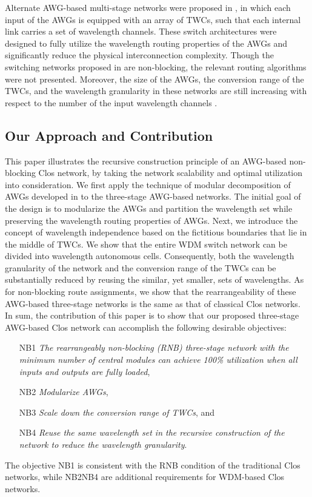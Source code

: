 \documentclass[journal]{IEEEtran}
\begin{document}
Alternate AWG-based multi-stage networks were proposed in
\cite{Bregni:JSAC2003,Maier:CM2004,Zhong:JLT1996,Leonardus:EU2007},
in which each input of the AWGs is equipped with an array of TWCs,
such that each internal link carries a set of wavelength channels.
These switch architectures were designed to fully utilize the
wavelength routing properties of the AWGs and significantly reduce
the physical interconnection complexity. Though the switching
networks proposed in \cite{Zhong:JLT1996,Leonardus:EU2007} are
non-blocking, the relevant routing algorithms were not presented.
Moreover, the size of the AWGs, the conversion range of the TWCs,
and the wavelength granularity in these networks are still
increasing with respect to the number of the input wavelength
channels .

\subsection{Our Approach and Contribution}
This paper illustrates the recursive construction principle of an
AWG-based non-blocking Clos network, by taking the network
scalability and optimal utilization into consideration. We first
apply the technique of modular decomposition of AWGs developed in
\cite{Ye:JLT2012} to the three-stage AWG-based networks. The initial
goal of the design is to modularize the AWGs and partition the
wavelength set while preserving the wavelength routing properties of
AWGs. Next, we introduce the concept of wavelength independence
based on the fictitious boundaries that lie in the middle of TWCs.
We show that the entire WDM switch network can be divided into
wavelength autonomous cells. Consequently, both the wavelength
granularity of the network and the conversion range of the TWCs can
be substantially reduced by reusing the similar, yet smaller, sets
of wavelengths. As for non-blocking route assignments, we show that
the rearrangeability of these AWG-based three-stage networks is the
same as that of classical Clos networks. In sum, the contribution of
this paper is to show that our proposed three-stage AWG-based Clos
network can accomplish the following desirable objectives:
\begin{itemize}
[]
\item[NB1] \emph{The rearrangeably non-blocking (RNB) three-stage network with the minimum number of central modules
can achieve 100\% utilization when all inputs and outputs are fully
loaded},
\item[NB2] \emph{Modularize AWGs},
\item[NB3] \emph{Scale down the conversion range of TWCs}, and
\item[NB4] \emph{Reuse the same wavelength set in the recursive construction of the network to reduce the wavelength
granularity}.
\end{itemize}
The objective NB1 is consistent with the RNB condition of the
traditional Clos networks, while NB2NB4 are additional
requirements for WDM-based Clos networks.
\end{document}
